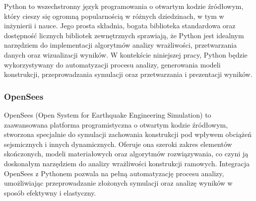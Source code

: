 Python to wszechstronny język programowania o otwartym kodzie źródłowym, który cieszy się ogromną popularnością w różnych dziedzinach, w tym w inżynierii i nauce.
Jego prosta składnia, bogata biblioteka standardowa oraz dostępność licznych bibliotek zewnętrznych sprawiają, że Python jest idealnym narzędziem do implementacji algorytmów analizy wrażliwości, przetwarzania danych oraz wizualizacji wyników.
W kontekście niniejszej pracy, Python będzie wykorzystywany do automatyzacji procesu analizy, generowania modeli konstrukcji, przeprowadzania symulacji oraz przetwarzania i prezentacji wyników.

\subsubsection{OpenSees}

OpenSees (Open System for Earthquake Engineering Simulation) to zaawansowana platforma programistyczna o otwartym kodzie źródłowym, stworzona specjalnie do symulacji zachowania konstrukcji pod wpływem obciążeń sejsmicznych i innych dynamicznych.
Oferuje ona szeroki zakres elementów skończonych, modeli materiałowych oraz algorytmów rozwiązywania, co czyni ją doskonałym narzędziem do analizy wrażliwości konstrukcji ramowych.
Integracja OpenSees z Pythonem pozwala na pełną automatyzację procesu analizy, umożliwiając przeprowadzanie złożonych symulacji oraz analizę wyników w sposób efektywny i elastyczny.